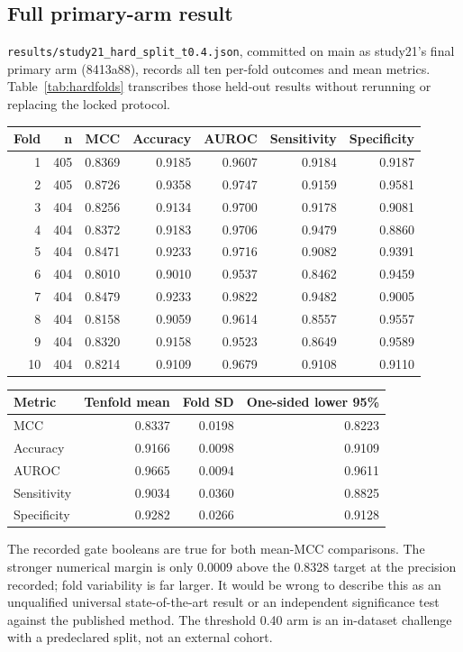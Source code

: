 \subsection*{Full primary-arm result}
\texttt{results/study21\_hard\_split\_t0.4.json}, committed on main as study21's final primary arm (8413a88), records all ten per-fold outcomes and mean metrics. Table~\ref{tab:hardfolds} transcribes those held-out results without rerunning or replacing the locked protocol.
\begin{center}\small\begin{tabular}{rrrrrrr}\hline
Fold & n & MCC & Accuracy & AUROC & Sensitivity & Specificity\\\hline
1 & 405 & 0.8369 & 0.9185 & 0.9607 & 0.9184 & 0.9187\\
2 & 405 & 0.8726 & 0.9358 & 0.9747 & 0.9159 & 0.9581\\
3 & 404 & 0.8256 & 0.9134 & 0.9700 & 0.9178 & 0.9081\\
4 & 404 & 0.8372 & 0.9183 & 0.9706 & 0.9479 & 0.8860\\
5 & 404 & 0.8471 & 0.9233 & 0.9716 & 0.9082 & 0.9391\\
6 & 404 & 0.8010 & 0.9010 & 0.9537 & 0.8462 & 0.9459\\
7 & 404 & 0.8479 & 0.9233 & 0.9822 & 0.9482 & 0.9005\\
8 & 404 & 0.8158 & 0.9059 & 0.9614 & 0.8557 & 0.9557\\
9 & 404 & 0.8320 & 0.9158 & 0.9523 & 0.8649 & 0.9589\\
10 & 404 & 0.8214 & 0.9109 & 0.9679 & 0.9108 & 0.9110\\
\hline\end{tabular}\label{tab:hardfolds}\end{center}
\begin{center}\begin{tabular}{lrrr}\hline
Metric & Tenfold mean & Fold SD & One-sided lower 95\%\\\hline
MCC & 0.8337 & 0.0198 & 0.8223\\
Accuracy & 0.9166 & 0.0098 & 0.9109\\
AUROC & 0.9665 & 0.0094 & 0.9611\\
Sensitivity & 0.9034 & 0.0360 & 0.8825\\
Specificity & 0.9282 & 0.0266 & 0.9128\\\hline
\end{tabular}\end{center}
The recorded gate booleans are true for both mean-MCC comparisons. The stronger numerical margin is only 0.0009 above the 0.8328 target at the precision recorded; fold variability is far larger. It would be wrong to describe this as an unqualified universal state-of-the-art result or an independent significance test against the published method. The threshold 0.40 arm is an in-dataset challenge with a predeclared split, not an external cohort.

